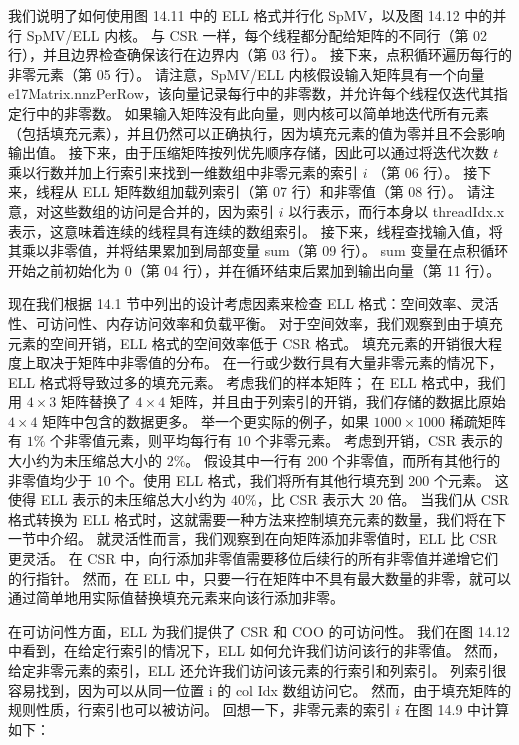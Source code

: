 我们说明了如何使用图 14.11 中的 ELL 格式并行化 SpMV，以及图 14.12 中的并行 SpMV/ELL 内核。 与 CSR 一样，每个线程都分配给矩阵的不同行（第 02 行），并且边界检查确保该行在边界内（第 03 行）。 接下来，点积循环遍历每行的非零元素（第 05 行）。 请注意，SpMV/ELL 内核假设输入矩阵具有一个向量 e17Matrix.nnzPerRow，该向量记录每行中的非零数，并允许每个线程仅迭代其指定行中的非零数。 如果输入矩阵没有此向量，则内核可以简单地迭代所有元素（包括填充元素），并且仍然可以正确执行，因为填充元素的值为零并且不会影响输出值。 接下来，由于压缩矩阵按列优先顺序存储，因此可以通过将迭代次数 $t$ 乘以行数并加上行索引来找到一维数组中非零元素的索引 $i$ （第 06 行）。 接下来，线程从 ELL 矩阵数组加载列索引（第 07 行）和非零值（第 08 行）。 请注意，对这些数组的访问是合并的，因为索引 $i$ 以行表示，而行本身以 threadIdx.x 表示，这意味着连续的线程具有连续的数组索引。 接下来，线程查找输入值，将其乘以非零值，并将结果累加到局部变量 sum（第 09 行）。 sum 变量在点积循环开始之前初始化为 0（第 04 行），并在循环结束后累加到输出向量（第 11 行）。

现在我们根据 14.1 节中列出的设计考虑因素来检查 ELL 格式：空间效率、灵活性、可访问性、内存访问效率和负载平衡。 对于空间效率，我们观察到由于填充元素的空间开销，ELL 格式的空间效率低于 CSR 格式。 填充元素的开销很大程度上取决于矩阵中非零值的分布。 在一行或少数行具有大量非零元素的情况下，ELL 格式将导致过多的填充元素。 考虑我们的样本矩阵； 在 ELL 格式中，我们用 $4 \times 3$ 矩阵替换了 $4 \times 4$ 矩阵，并且由于列索引的开销，我们存储的数据比原始 $4 \times 4$ 矩阵中包含的数据更多。 举一个更实际的例子，如果 $1000 \times 1000$ 稀疏矩阵有 $1 \%$ 个非零值元素，则平均每行有 10 个非零元素。 考虑到开销，CSR 表示的大小约为未压缩总大小的 $2 \%$。 假设其中一行有 200 个非零值，而所有其他行的非零值均少于 10 个。使用 ELL 格式，我们将所有其他行填充到 200 个元素。 这使得 ELL 表示的未压缩总大小约为 $40 \%$，比 CSR 表示大 20 倍。 当我们从 CSR 格式转换为 ELL 格式时，这就需要一种方法来控制填充元素的数量，我们将在下一节中介绍。 就灵活性而言，我们观察到在向矩阵添加非零值时，ELL 比 CSR 更灵活。 在 CSR 中，向行添加非零值需要移位后续行的所有非零值并递增它们的行指针。 然而，在 ELL 中，只要一行在矩阵中不具有最大数量的非零，就可以通过简单地用实际值替换填充元素来向该行添加非零。

在可访问性方面，ELL 为我们提供了 CSR 和 COO 的可访问性。 我们在图 14.12 中看到，在给定行索引的情况下，ELL 如何允许我们访问该行的非零值。 然而，给定非零元素的索引，ELL 还允许我们访问该元素的行索引和列索引。 列索引很容易找到，因为可以从同一位置 i 的 col Idx 数组访问它。 然而，由于填充矩阵的规则性质，行索引也可以被访问。 回想一下，非零元素的索引 $i$ 在图 14.9 中计算如下：

